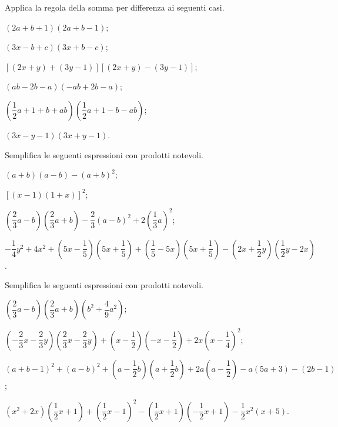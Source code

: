 \begin{esercizio}[\Ast]
 \label{ese:12.21}
Applica la regola della somma per differenza ai seguenti casi.

\begin{enumeratea}
\item $(2a+b+1)(2a+b-1)$;
\item $(3x-b+c)(3x+b-c)$;
\item $\left[(2x+y)+(3y-1)\right]\left[(2x+y)-(3y-1)\right]$;
\item $(ab-2b-a)(-{ab}+2b-a)$;
\item $\left(\dfrac{1}{2}a+1+b+ab\right)\left(\dfrac{1}{2}a+1-b-ab\right)$;
\item $(3x-y-1)(3x+y-1)$.
\end{enumeratea}
\end{esercizio}

\begin{esercizio}[\Ast]
 \label{ese:12.22}
Semplifica le seguenti espressioni con prodotti notevoli.
 \begin{enumeratea}
 \item $(a+b)(a-b)-(a+b)^{2}$;
 \item $[(x-1)(1+x)]^{2}$;
 \item $\left(\dfrac{2}{3}a-b\right)\left(\dfrac{2}{3}a+b\right)-\dfrac{2}{3}(a-b)^{2}+2\left(\dfrac{1}{3}a\right)^{2}$;
 \item 
 $-\dfrac{1}{4}y^{2}+4x^{2}+\left(5x-\dfrac{1}{5}\right)\left(5x+\dfrac{1}{5}\right)+\left(\dfrac{1}{5}-5x\right)\left(5x+\dfrac{1}{5}\right)-\left(2x+\dfrac{1}{2}y\right)\left(\dfrac{1}{2}y-2x\right)$.
 \end{enumeratea}
\end{esercizio}

\pagebreak
\begin{esercizio}[\Ast]
 \label{ese:12.23}
Semplifica le seguenti espressioni con prodotti notevoli.

 \begin{enumeratea}
 \item $\left(\dfrac{2}{3}a-b\right)\left(\dfrac{2}{3}a+b\right)\left(b^{2}+\dfrac{4}{9}a^{2}\right)$;
 \item $\left(-{\dfrac{2}{3}x-\dfrac{2}{3}y}\right)\left(\dfrac{2}{3}x-\dfrac{2}{3}y\right)+\left(x-\dfrac{1}{2}\right)\left(-x-\dfrac{1}{2}\right)+2x\left(x-\dfrac{1}{4}\right)^{2}$;
 \item $(a+b-1)^{2}+(a-b)^{2}+\left(a-\dfrac{1}{2}b\right)\left(a+\dfrac{1}{2}b\right)+2a\left(a-\dfrac{1}{2}\right)-a(5a+3)-(2b-1)$;
 \item $\left(x^{2}+2x\right)\left(\dfrac{1}{2}x+1\right)+\left(\dfrac{1}{2}x-1\right)^{2}-\left(\dfrac{1}{2}x+1\right)\left(-{\dfrac{1}{2}}x+1\right)-\dfrac{1}{2}x^{2}(x+5)$.
\end{enumeratea}
\end{esercizio}

